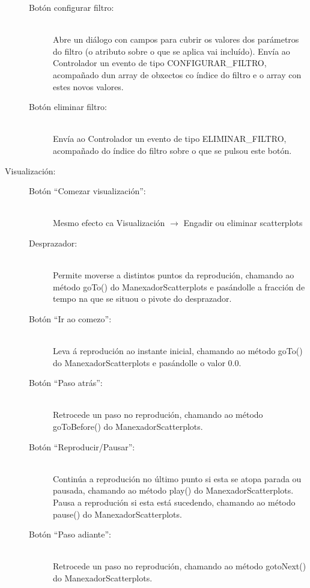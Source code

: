\begin{description}
\begin{description}
\item[Botón configurar filtro:] \hfill \\
Abre un diálogo con campos para cubrir os valores dos parámetros do filtro (o atributo sobre o que se aplica vai incluído). Envía ao Controlador un evento de tipo CONFIGURAR\_FILTRO, acompañado dun array de obxectos co índice do filtro e o array con estes novos valores.

\item[Botón eliminar filtro:] \hfill \\
Envía ao Controlador un evento de tipo ELIMINAR\_FILTRO, acompañado do índice do filtro sobre o que se pulsou este botón.

\end{description}

\item[Visualización:] \hfill

\begin{description}

\item[Botón ``Comezar visualización'':] \hfill \\
Mesmo efecto ca Visualización $\rightarrow$ Engadir ou eliminar scatterplots

\item[Desprazador:] \hfill \\
Permite moverse a distintos puntos da reprodución, chamando ao método goTo() do ManexadorScatterplots e pasándolle a fracción de tempo na que se situou o pivote do desprazador.

\item[Botón ``Ir ao comezo'':] \hfill \\
Leva á reprodución ao instante inicial, chamando ao método goTo() do ManexadorScatterplots e pasándolle o valor 0.0.

\item[Botón ``Paso atrás'':] \hfill \\
Retrocede un paso no reprodución, chamando ao método goToBefore() do ManexadorScatterplots.

\item[Botón ``Reproducir/Pausar'':] \hfill \\
Continúa a reprodución no último punto si esta se atopa parada ou pausada, chamando ao método play() do ManexadorScatterplots. Pausa a reprodución si esta está sucedendo, chamando ao método pause() do ManexadorScatterplots.

\item[Botón ``Paso adiante'':] \hfill \\
Retrocede un paso no reprodución, chamando ao método gotoNext() do ManexadorScatterplots.


\end{description}
\end{description}
